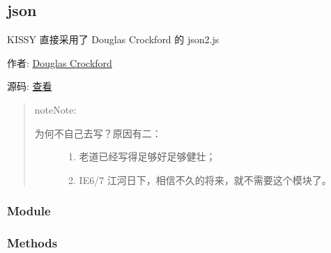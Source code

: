 \documentclass[letterpaper,10pt,english]{sphinxmanual}
\begin{document}
\subsection{json}
\label{api/core/json/index:json}\label{api/core/json/index::doc}
\begin{DUlineblock}{0em}
\item[] KISSY 直接采用了 Douglas Crockford 的 json2.js
\item[] 作者: \href{http://www.crockford.com/}{Douglas Crockford}
\item[] 源码: \href{http://github.com/kissyteam/kissy/blob/master/src/json/json2.js}{查看}
\end{DUlineblock}
\begin{quote}

\begin{notice}{note}{Note:}\begin{description}
\item[{为何不自己去写？原因有二：}] \leavevmode\begin{enumerate}
\item {}
老道已经写得足够好足够健壮；

\item {}
IE6/7 江河日下，相信不久的将来，就不需要这个模块了。

\end{enumerate}

\end{description}
\end{notice}
\end{quote}


\subsubsection{Module}
\label{api/core/json/index:module}\begin{quote}

{\hyperref[api/core/json/index:module-json]{}}
\end{quote}


\subsubsection{Methods}
\label{api/core/json/index:methods}
\end{document}
